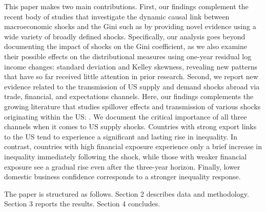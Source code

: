 \documentclass[12pt, a4paper]{article}
\begin{document}

This paper makes two main contributions. First, our findings complement the recent body of studies that investigate the dynamic causal link between macroeconomic shocks and the Gini such as \textcite{coibion2017innocent, Davtyan2017, furceri2018effects} by providing novel evidence using a wide variety of broadly defined shocks. Specifically, our analysis goes beyond documenting the impact of shocks on the Gini coefficient, as we also examine their possible effects on the distributional measures using one-year residual log income changes: standard deviation and Kelley skewness, revealing new patterns that have so far received little attention in prior research. Second, we report new evidence related to the transmission of US supply and demand shocks abroad via trade, financial, and expectations channels. Here, our findings complements the growing literature that studies spillover effects and transmission of various shocks originating within the US: \textcite{akinci2013global, bowman2015us, fernandez2017world, schmitt2018important, di2022international, azad2022spillovers, lastauskas2023global, LASTAUSKAS2024101956}. We document the critical importance of all three channels when it comes to US supply shocks. Countries with strong export links to the US tend to experience a significant and lasting rise in inequality. In contrast, countries with high financial exposure experience only a brief increase in inequality immediately following the shock, while those with weaker financial exposure see a gradual rise even after the three-year horizon. Finally, lower domestic business confidence corresponds to a stronger inequality response.


The paper is structured as follows. Section 2 describes data and methodology. Section 3 reports the results. Section 4 concludes.
\end{document}
